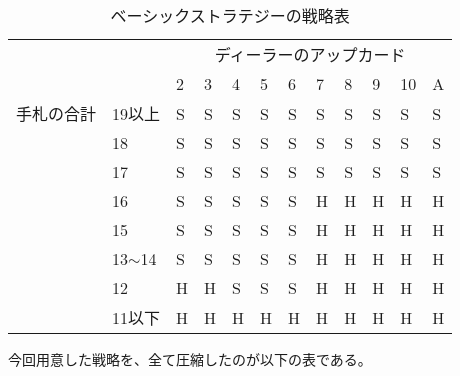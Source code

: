 \begin{table}[H]
\caption{ベーシックストラテジーの戦略表}
\label{table:data_type}
\begin{center}
\begin{tabular}{llllllllllll}
\hline
			     &              & \multicolumn{10}{c}{ディーラーのアップカード}      \\ \cline{3-12} 
                        &              & 2 & 3 & 4 & 5 & 6 & 7 & 8 & 9 & 10 & A \\ \hline
{手札の合計}  & 19以上        & S & S & S & S & S & S & S & S & S  & S \\
                        & 18          & S & S & S & S & S & S & S & S & S  & S \\
                        & 17          & S & S & S & S & S & S & S & S & S  & S \\
                        & 16          & S & S & S & S & S & H & H & H & H  & H \\
                        & 15          & S & S & S & S & S & H & H & H & H  & H \\
                        & 13$\sim$14  & S & S & S & S & S & H & H & H & H  & H \\
                        & 12          & H & H & S & S & S & H & H & H & H  & H \\
                        & 11以下        & H & H & H & H & H & H & H & H & H  & H
\end{tabular}
\end{center}
\end{table}

今回用意した戦略を、全て圧縮したのが以下の表である。



